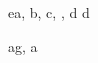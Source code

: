\begin{eqcode}{e}{a, b, c}{, , }{}
  d \in {} \lend
  d \gets {} \lend %
\end{eqcode}

\begin{eqcode}{a}{g, a }{}{}   
\end{eqcode}

